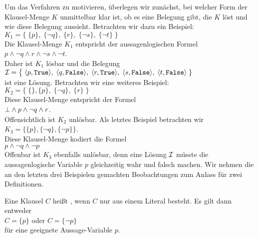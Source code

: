 Um das Verfahren zu motivieren, überlegen wir zunächst, bei welcher Form der Klausel-Menge $K$
unmittelbar klar ist, ob es eine Belegung gibt, die $K$ löst und wie diese Belegung
aussieht.  Betrachten wir dazu ein Beispiel: \\[0.2cm]
\hspace*{1.3cm} 
$K_1 = \bigl\{\; \{p\},\; \{\neg q\},\; \{r\},\; \{\neg s\}, \; \{\neg t\} \;\bigr\}$ 
\\[0.2cm]
Die Klausel-Menge $K_1$ entspricht der aussagenlogischen Formel
\\[0.2cm]
\hspace*{1.3cm}
$p \wedge \neg q \wedge r \wedge \neg s \wedge \neg t$.
\\[0.2cm]
Daher ist $K_1$ lösbar und die Belegung  \\[0.2cm]
\hspace*{1.3cm} 
$\I = \bigl\{\; \pair(p, \texttt{True}),\; \pair(q, \texttt{False}),\;\pair(r, \texttt{True}),\; \pair(s, \texttt{False}),\; \pair(t, \texttt{False})\;\}$
\\[0.2cm]
ist eine Lösung.  Betrachten wir eine weiteres Beispiel: \\[0.2cm]
\hspace*{1.3cm} 
$K_2 = \bigl\{\; \{\}, \{p\},\; \{\neg q\},\; \{r\}\; \bigr\}$ 
\\[0.2cm]
Diese Klausel-Menge entspricht der Formel
\\[0.2cm]
\hspace*{1.3cm}
$\bot \wedge p \wedge \neg q \wedge r$.
\\[0.2cm]
Offensichtlich ist $K_2$ unlösbar.  Als letztes Beispiel betrachten wir 
\\[0.2cm]
\hspace*{1.3cm} $K_3 = \bigl\{ \{p\}, \{\neg q\}, \{\neg p\} \bigr\}$.
\\[0.2cm]
Diese Klausel-Menge kodiert die Formel
\\[0.2cm]
\hspace*{1.3cm}
$p \wedge \neg q \wedge \neg p $
\\[0.2cm]
Offenbar ist $K_3$ ebenfalls unlösbar, denn eine Lösung $\mathcal{I}$ müsste die aussagenlogische Variable $p$ gleichzeitig
wahr und falsch machen.
Wir nehmen die an den letzten drei Beispielen gemachten Beobachtungen zum Anlass für zwei Definitionen.

\begin{Definition}
  Eine Klausel $C$ heißt , wenn $C$ nur aus einem Literal besteht.
  Es gilt dann entweder
  \\[0.2cm]
  \hspace*{1.3cm}
  $C = \{p\}$ \quad oder \quad $C = \{\neg p\}$ 
  \\[0.2cm]
  für eine geeignete Aussage-Variable $p$. \eox
\end{Definition}


